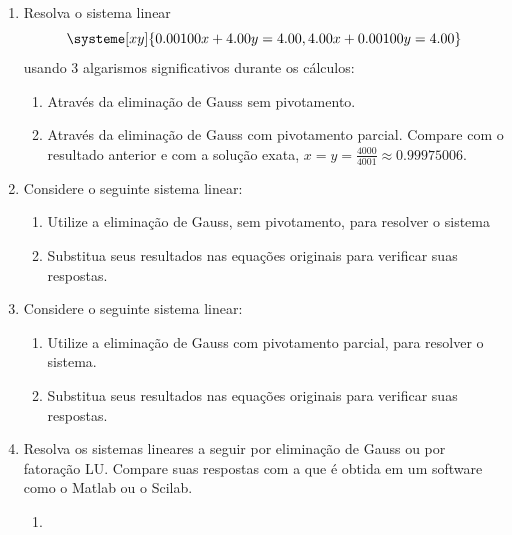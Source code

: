 \documentclass[12pt,a4paper]{article}
\newcommand{\IconCalc}{\texttt{[image: calculator.png]}}
\newlength{\SmileysLength}
\newcommand{\calc}{\hspace*{-\SmileysLength}\makebox[0pt][r]{\IconCalc}%
   \hspace*{\SmileysLength}}
\begin{document}
\begin{enumerate}
\item %
Resolva o sistema linear
\[
\systeme[xy]{
0.00100 x + 4.00    y = 4.00,
4.00    x + 0.00100 y = 4.00
}
\]
usando 3 algarismos significativos durante os cálculos:
\begin{enumerate}
\item Através da eliminação de Gauss sem pivotamento.
\item Através da eliminação de Gauss com pivotamento parcial. Compare com o resultado anterior e com a solução exata, $x = y = \frac{4000}{4001} \approx 0.99975006$.
\end{enumerate}
\item Considere o seguinte sistema linear:
\begin{enumerate}
\item Utilize a eliminação de Gauss, sem pivotamento, para resolver o sistema
\item Substitua seus resultados nas equações originais para verificar suas respostas.
\end{enumerate}

\item Considere o seguinte sistema linear:
\begin{enumerate}
\item Utilize a eliminação de Gauss com pivotamento parcial, para resolver o sistema.
\item Substitua seus resultados nas equações originais para verificar suas respostas.
\end{enumerate}
\item Resolva os sistemas lineares a seguir por eliminação de Gauss ou por fatoração LU. Compare suas respostas com a que é obtida em um software como o Matlab ou o Scilab.
\begin{multicols}{2}
\begin{enumerate}
\item {}


\end{enumerate}
\end{multicols}
\end{enumerate}
\end{document}
